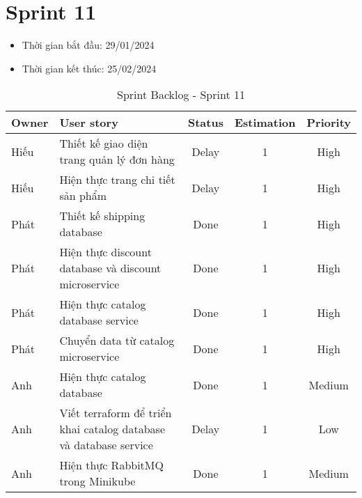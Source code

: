 \section{Sprint 11}
\begin{itemize}
    \item Thời gian bắt đầu: 29/01/2024
    \item Thời gian kết thúc: 25/02/2024
\end{itemize}
\begin{table}[H]
    \begin{tabular}{|m{2.5cm}|m{6cm}|c|c|c|}
    \hline
    \textbf{Owner}  & \textbf{User story}                                & \textbf{Status} & \textbf{Estimation} & \textbf{Priority} \\ \hline
    Hiếu               & Thiết kế giao diện trang quản lý đơn hàng                    & Delay            & 1                   & High         \\ \hline
    Hiếu              & Hiện thực trang chi tiết sản phẩm                     & Delay            & 1                   & High         \\ \hline
    Phát               & Thiết kế shipping database                    & Done            & 1                   & High         \\ \hline
    Phát              & Hiện thực discount database và discount microservice                  & Done            & 1                   & High         \\ \hline
    Phát              & Hiện thực catalog database service                   & Done            & 1                   & High         \\ \hline
    Phát              & Chuyển data từ catalog microservice                   & Done            & 1                   & High         \\ \hline
    Anh              & Hiện thực catalog database                   & Done            & 1                   & Medium         \\ \hline
    Anh              & Viết terraform để triển khai catalog database và database service                   & Delay            & 1                   & Low         \\ \hline
    Anh              & Hiện thực RabbitMQ trong Minikube                   & Done            & 1                   & Medium         \\ \hline
    \end{tabular}
    \caption{Sprint Backlog - Sprint 11}
    \label{tab:sprint-11}
\end{table}
